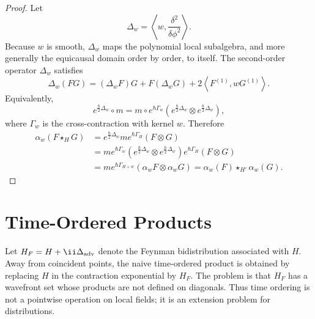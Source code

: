 \begin{proof}
Let
\[
  \Delta_w=\left\langle w,\frac{\delta^2}{\delta\phi^2}\right\rangle .
\]
Because \(w\) is smooth, \(\Delta_w\) maps the polynomial local subalgebra,
and more generally the equicausal domain order by order, to itself.  The
second-order operator \(\Delta_w\) satisfies
\begin{equation}
  \Delta_w(FG)
  =
  (\Delta_wF)G+F(\Delta_wG)
  +
  2\left\langle F^{(1)},wG^{(1)}\right\rangle .
  \label{eq:paqft-laplacian-product-rule}
\end{equation}
Equivalently,
\begin{equation}
  e^{\frac{\hbar}{2}\Delta_w}\circ m
  =
  m\circ e^{\hbar\Gamma_w}
    \left(e^{\frac{\hbar}{2}\Delta_w}\otimes
          e^{\frac{\hbar}{2}\Delta_w}\right),
  \label{eq:paqft-alpha-coproduct-identity}
\end{equation}
where \(\Gamma_w\) is the cross-contraction with kernel \(w\).  Therefore
\[
\begin{aligned}
  \alpha_w(F\star_HG)
  &=
  e^{\frac{\hbar}{2}\Delta_w}
  m e^{\hbar\Gamma_H}(F\otimes G)\\
  &=
  m e^{\hbar\Gamma_w}
  \left(e^{\frac{\hbar}{2}\Delta_w}\otimes
        e^{\frac{\hbar}{2}\Delta_w}\right)
  e^{\hbar\Gamma_H}(F\otimes G)\\
  &=
  m e^{\hbar\Gamma_{H+w}}(\alpha_wF\otimes\alpha_wG)
  =
  \alpha_w(F)\star_{H'}\alpha_w(G).
\end{aligned}
\]
\end{proof}

\section{Time-Ordered Products}

Let \(H_F=H+\ii\Delta_{\rm adv}\) denote the Feynman bidistribution
associated with \(H\).  Away from coincident points, the naive time-ordered
product is obtained by replacing \(H\) in the contraction exponential by
\(H_F\).  The problem is that \(H_F\) has a wavefront set whose products are
not defined on diagonals.  Thus time ordering is not a pointwise operation on
local fields; it is an extension problem for distributions.

